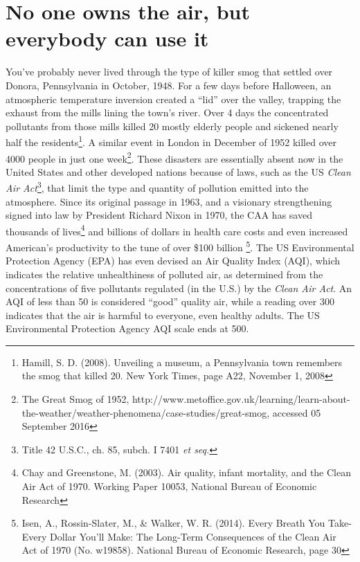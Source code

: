 \section{No one owns the air, but everybody can use it}
You've probably never lived through the type of killer smog that settled over Donora, Pennsylvania in October, 1948. For a few days before Halloween, an atmospheric temperature inversion created a ``lid'' over the valley, trapping the exhaust from the mills lining the town's river. Over 4 days the concentrated pollutants from those mills killed 20 mostly elderly people and sickened nearly half the residents\footnote{Hamill, S. D. (2008). Unveiling a museum, a Pennsylvania town remembers the smog that killed 20. New York Times, page A22, November 1, 2008}. A similar event in London in December of 1952 killed over 4000 people in just one week\footnote{The Great Smog of 1952, http://www.metoffice.gov.uk/learning/learn-about-the-weather/weather-phenomena/case-studies/great-smog, accessed 05 September 2016}. These disasters are essentially absent now in the United States and other developed nations because of laws, such as the US \emph{Clean Air Act}\footnote{Title 42 U.S.C., ch. 85, subch. I 7401 \textit{et seq.}}, that limit the type and quantity of pollution emitted into the atmosphere. Since its original passage in 1963, and a visionary strengthening signed into law by President Richard Nixon in 1970, the CAA has saved thousands of lives\footnote{Chay and Greenstone, M. (2003). Air quality, infant mortality, and the Clean Air Act of 1970. Working Paper 10053, National Bureau of Economic Research} and billions of dollars in health care costs and even increased American's productivity to the tune of over \$100 billion \footnote{Isen, A., Rossin-Slater, M., \& Walker, W. R. (2014). Every Breath You Take-Every Dollar You'll Make: The Long-Term Consequences of the Clean Air Act of 1970 (No. w19858). National Bureau of Economic Research, page 30}. The US Environmental Protection Agency (EPA) has even devised an Air Quality Index (AQI), which indicates the relative unhealthiness of polluted air, as determined from the concentrations of five pollutants regulated (in the U.S.) by the \emph{Clean Air Act}. An AQI of less than 50 is considered ``good'' quality air, while a reading over 300 indicates that the air is harmful to everyone, even healthy adults. The US Environmental Protection Agency AQI scale ends at 500.

